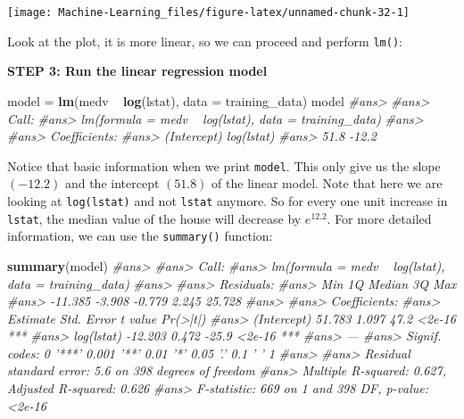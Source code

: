 \documentclass[]{book}
\newenvironment{Shaded}{\begin{snugshade}}{\end{snugshade}}
\newcommand{\KeywordTok}[1]{\textcolor[rgb]{0.13,0.29,0.53}{\textbf{{#1}}}}
\newcommand{\DataTypeTok}[1]{\textcolor[rgb]{0.13,0.29,0.53}{{#1}}}
\newcommand{\StringTok}[1]{\textcolor[rgb]{0.31,0.60,0.02}{{#1}}}
\newcommand{\CommentTok}[1]{\textcolor[rgb]{0.56,0.35,0.01}{\textit{{#1}}}}
\newcommand{\NormalTok}[1]{{#1}}
\begin{document}
\begin{center}\texttt{[image: Machine-Learning\_files/figure-latex/unnamed-chunk-32-1]} \end{center}

Look at the plot, it is more linear, so we can proceed and perform
\texttt{lm()}:

\textbf{STEP 3: Run the linear regression model}

\begin{Shaded}
\begin{Highlighting}[]
\NormalTok{model =}\StringTok{ }\KeywordTok{lm}\NormalTok{(medv ~}\StringTok{ }\KeywordTok{log}\NormalTok{(lstat), }\DataTypeTok{data =} \NormalTok{training_data)}
\NormalTok{model}
\CommentTok{#ans> }
\CommentTok{#ans> Call:}
\CommentTok{#ans> lm(formula = medv ~ log(lstat), data = training_data)}
\CommentTok{#ans> }
\CommentTok{#ans> Coefficients:}
\CommentTok{#ans> (Intercept)   log(lstat)  }
\CommentTok{#ans>        51.8        -12.2}
\end{Highlighting}
\end{Shaded}

Notice that basic information when we print \texttt{model}. This only
give us the slope \((-12.2)\) and the intercept \((51.8)\) of the linear
model. Note that here we are looking at \texttt{log(lstat)} and not
\texttt{lstat} anymore. So for every one unit increase in
\texttt{lstat}, the median value of the house will decrease by
\(e^{12.2}\). For more detailed information, we can use the
\texttt{summary()} function:

\begin{Shaded}
\begin{Highlighting}[]
\KeywordTok{summary}\NormalTok{(model)}
\CommentTok{#ans> }
\CommentTok{#ans> Call:}
\CommentTok{#ans> lm(formula = medv ~ log(lstat), data = training_data)}
\CommentTok{#ans> }
\CommentTok{#ans> Residuals:}
\CommentTok{#ans>     Min      1Q  Median      3Q     Max }
\CommentTok{#ans> -11.385  -3.908  -0.779   2.245  25.728 }
\CommentTok{#ans> }
\CommentTok{#ans> Coefficients:}
\CommentTok{#ans>             Estimate Std. Error t value Pr(>|t|)    }
\CommentTok{#ans> (Intercept)   51.783      1.097    47.2   <2e-16 ***}
\CommentTok{#ans> log(lstat)   -12.203      0.472   -25.9   <2e-16 ***}
\CommentTok{#ans> ---}
\CommentTok{#ans> Signif. codes:  0 '***' 0.001 '**' 0.01 '*' 0.05 '.' 0.1 ' ' 1}
\CommentTok{#ans> }
\CommentTok{#ans> Residual standard error: 5.6 on 398 degrees of freedom}
\CommentTok{#ans> Multiple R-squared:  0.627,   Adjusted R-squared:  0.626 }
\CommentTok{#ans> F-statistic:  669 on 1 and 398 DF,  p-value: <2e-16}
\end{Highlighting}
\end{Shaded}
\end{document}
